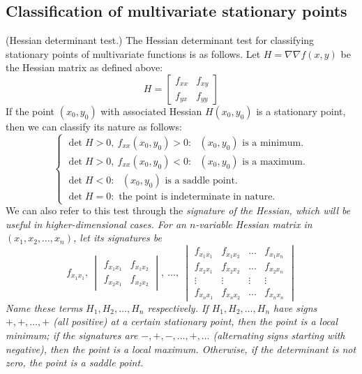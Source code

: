 \documentclass{article}
\begin{document}
\subsection{Classification of multivariate stationary points}
\begin{theorem}
    (Hessian determinant test.) The Hessian determinant test for classifying stationary points of multivariate functions is as follows. Let $H = \nabla \nabla f(x,y)$ be the Hessian matrix as defined above:
    \begin{equation*}
        H = \begin{bmatrix}
            f_{xx} & f_{xy} \\
            f_{yx} & f_{yy}
        \end{bmatrix}
    \end{equation*}
    If the point $(x_0,y_0)$ with associated Hessian $H(x_0,y_0)$ is a stationary point, then we can classify its nature as follows:
    \begin{equation*}
        \begin{cases}
            \det H>0,\ f_{xx}(x_0,y_0) > 0: \text{ $(x_0, y_0)$ is a minimum.}\\
            \det H>0,\ f_{xx}(x_0,y_0) < 0: \text{ $(x_0, y_0)$ is a maximum.}\\
            \det H<0: \text{ $(x_0, y_0)$ is a saddle point.}\\
            \det H = 0: \text{ the point is indeterminate in nature.}
        \end{cases}
    \end{equation*}
    We can also refer to this test through the \it signature \normalfont of the Hessian, which will be useful in higher-dimensional cases. For an $n$-variable Hessian matrix in $(x_1,x_2,\dots,x_n)$, let its signatures be
    \begin{equation*}
        f_{x_1 x_1},\ \begin{vmatrix}
            f_{x_1x_1} & f_{x_1x_2}\\
            f_{x_2x_1} & f_{x_2x_2}
        \end{vmatrix},\ \dots,\ \begin{vmatrix}
            f_{x_1x_1} & f_{x_1x_2} & \dots & f_{x_1x_n} \\
            f_{x_2x_1} & f_{x_2x_2} & \dots & f_{x_2x_n} \\
            \vdots & \vdots & \vdots & \vdots \\
            f_{x_nx_1} & f_{x_n x_2} & \dots & f_{x_nx_n}
        \end{vmatrix}
    \end{equation*}
    Name these terms $H_1, H_2, \dots, H_n$ respectively. If $H_1, H_2, \dots, H_n$ have signs $+, +, \dots, +$ (all positive) at a certain stationary point, then the point is a local minimum; if the signatures are $-, +, -, \dots, +, \dots$ (alternating signs starting with negative), then the point is a local maximum. Otherwise, if the determinant is not zero, the point is a saddle point.
\end{theorem}
\end{document}
